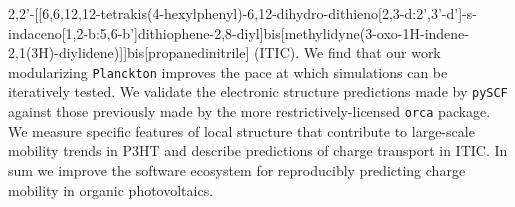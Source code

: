 2,2'-[[6,6,12,12-tetrakis(4-hexylphenyl)-6,12-dihydro-dithieno[2,3-d:2',3'-d']-s-indaceno[1,2-b:5,6-b']dithiophene-2,8-diyl]bis[methylidyne(3-oxo-1H-indene-2,1(3H)-diylidene)]]bis[propanedinitrile] (ITIC).
We find that our work modularizing \texttt{Planckton} improves the pace at which simulations can be iteratively tested.
We validate the electronic structure predictions made by \texttt{pySCF} against those previously made by the more restrictively-licensed \texttt{orca} package.
We measure specific features of local structure that contribute to large-scale mobility trends in P3HT and describe predictions of charge transport in ITIC.
In sum we improve the software ecosystem for reproducibly predicting charge mobility in organic photovoltaics.

